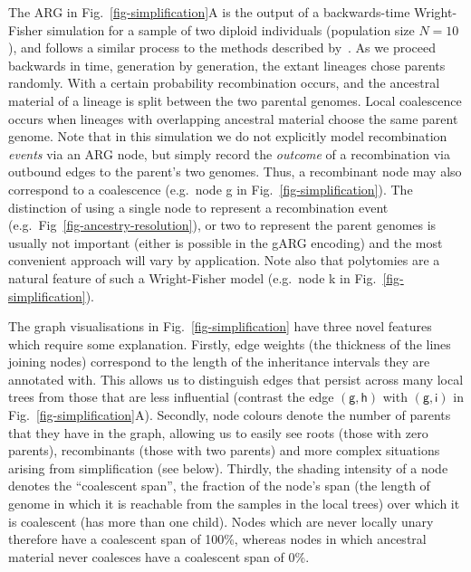 \documentclass{article}
\newcommand{\noderef}[1]{\textsf{#1}}
\begin{document}
The ARG in Fig.~\ref{fig-simplification}A is the output of a
backwards-time Wright-Fisher simulation for a sample of two diploid
individuals (population size $N=10$), and follows a similar process
to the methods described by~\cite{nelson2020accounting}.
As we proceed backwards in time, generation by generation, the
extant lineages chose parents randomly.
With a certain probability recombination occurs, and the ancestral
material of a lineage is split between the two parental
genomes. Local coalescence occurs
when lineages with overlapping ancestral material choose the same
parent genome.
Note that in this simulation we do not explicitly
model recombination \emph{events} via an ARG node, but simply record
the \emph{outcome} of a recombination via outbound edges to
the parent's two genomes.
Thus, a recombinant node may also correspond to a coalescence
(e.g.~node \noderef{g} in Fig.~\ref{fig-simplification}).
The distinction of
using a single node to represent
a recombination event (e.g.~Fig~\ref{fig-ancestry-resolution}),
or two to represent the parent genomes is usually not important
(either is possible in the gARG encoding)
and the most convenient approach will vary by application.
Note also that polytomies are a natural feature of such
a Wright-Fisher model
(e.g.~node \noderef{k} in Fig.~\ref{fig-simplification}).

The graph visualisations in Fig.~\ref{fig-simplification} have
three novel features which require some explanation.
Firstly, edge weights (the thickness of the lines joining
nodes) correspond to the length of the inheritance intervals
they are annotated with. This allows us to distinguish
edges that persist across many local trees from those that are
less influential (contrast the edge
$(\noderef{g}, \noderef{h})$
with $(\noderef{g}, \noderef{i})$
in Fig.~\ref{fig-simplification}A).
Secondly, node colours denote the number of parents that they
have in the graph, allowing us to easily see roots (those
with zero parents), recombinants (those with two parents)
and more complex situations arising from simplification (see below).
Thirdly, the shading intensity of a node denotes the ``coalescent span'', the
fraction of the node's span (the length of genome in which it
is reachable from the samples in the local trees)
over which it is coalescent (has more than one child). Nodes which
are never locally unary therefore have a coalescent span of 100\%,
whereas nodes in which ancestral material never coalesces have a
coalescent span of 0\%.
\end{document}

